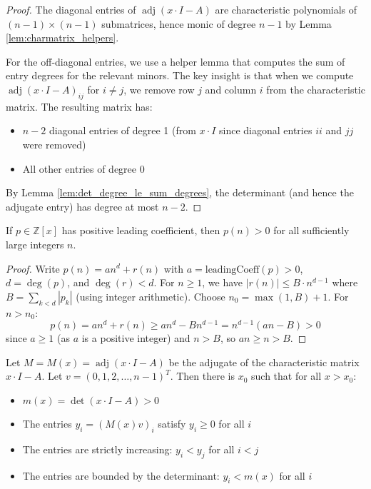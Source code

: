 \begin{proof}
The diagonal entries of $\operatorname{adj}(x\cdot I - A)$ are characteristic polynomials of $(n-1) \times (n-1)$ submatrices, 
hence monic of degree $n-1$ by Lemma \ref{lem:charmatrix_helpers}. 

For the off-diagonal entries, we use a helper lemma that computes the sum of entry degrees for the relevant minors.
The key insight is that when we compute $\operatorname{adj}(x\cdot I - A)_{ij}$ for $i \neq j$, 
we remove row $j$ and column $i$ from the characteristic matrix. The resulting matrix has:
\begin{itemize}
\item $n-2$ diagonal entries of degree 1 (from $x \cdot I$ since diagonal entries $ii$ and $jj$ were removed)
\item All other entries of degree 0
\end{itemize}
By Lemma \ref{lem:det_degree_le_sum_degrees}, the determinant (and hence the adjugate entry) has degree at most $n-2$.
\end{proof}

\begin{lemma}
\label{lem:polynomial_positive_for_largeZ}
\leanok
If $p \in \mathbb{Z}[x]$ has positive leading coefficient, then $p(n) > 0$ for all sufficiently large integers $n$.
\end{lemma}

\begin{proof}
Write $p(n) = an^d + r(n)$ with $a = \text{leadingCoeff}(p) > 0$, $d = \deg(p)$, and $\deg(r) < d$.
For $n \geq 1$, we have $|r(n)| \leq B \cdot n^{d-1}$ where $B = \sum_{k < d} |p_k|$ (using integer arithmetic).
Choose $n_0 = \max(1, B) + 1$. For $n > n_0$:
$$p(n) = an^d + r(n) \geq an^d - Bn^{d-1} = n^{d-1}(an - B) > 0$$
since $a \geq 1$ (as $a$ is a positive integer) and $n > B$, so $an \geq n > B$.
\end{proof}

\begin{lemma}
\label{lem:adj_poly_strict_increasing}
Let $M = M(x) = \operatorname{adj}(x\cdot I - A)$ be the adjugate of the characteristic matrix $x\cdot I - A$.
Let $v = (0,1,2,\ldots,n-1)^T$. Then there is $x_0$ such that for all $x > x_0$:
\begin{itemize}
\item $m(x) = \det(x\cdot I - A) > 0$
\item The entries $y_i = (M(x)v)_i$ satisfy $y_i \geq 0$ for all $i$
\item The entries are strictly increasing: $y_i < y_j$ for all $i < j$
\item The entries are bounded by the determinant: $y_i < m(x)$ for all $i$
\end{itemize}
\end{lemma}

